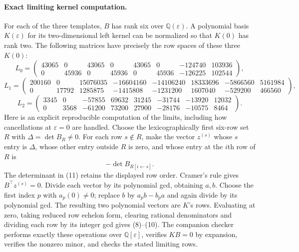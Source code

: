 \documentclass[11pt]{article}
\begin{document}
\paragraph{Exact limiting kernel computation.}
For each of the three templates, $B$ has rank six over
$\mathbb Q(\varepsilon)$. A polynomial basis $K(\varepsilon)$ for
its two-dimensional left kernel can be normalized so that $K(0)$
has rank two. The following matrices have precisely the row spaces
of these three $K(0)$:
\[
 L_0=\begin{pmatrix}
 43065&0&43065&0&43065&0&-124740&103936\\
 0&45936&0&45936&0&45936&-126225&102544
 \end{pmatrix},
 \tag{8}
\]
\[
 L_1=\begin{pmatrix}
 200160&0&15076035&-16604160&-14106240&18333696&-5866560&5161984\\
 0&17792&1285875&-1415808&-1231200&1607040&-529200&466560
 \end{pmatrix},
 \tag{9}
\]
\[
 L_2=\begin{pmatrix}
 3345&0&-57855&69632&31245&-31744&-13920&12032\\
 0&3568&-61200&73200&27900&-28176&-10575&8464
 \end{pmatrix}.
 \tag{10}
\]
Here is an explicit reproducible computation of the limits, including
how cancellations at $\varepsilon=0$ are handled. Choose the
lexicographically first six-row set $R$ with
$\Delta=\det B_R\ne0$. For each row $s\notin R$, make the vector
$z^{(s)}$ whose $s$ entry is $\Delta$, whose other entry outside
$R$ is zero, and whose entry at the $i$th row of $R$ is
\[
 -\det B_{R[i\leftarrow s]}.
 \tag{11}
\]
The determinant in (11) retains the displayed row order. Cramer's
rule gives $B^\top z^{(s)}=0$. Divide each vector by its polynomial
gcd, obtaining $a,b$. Choose the first index $p$ with $a_p(0)\ne0$;
replace $b$ by $a_pb-b_pa$ and again divide by its polynomial gcd.
The resulting two polynomial vectors are $K$'s rows. Evaluating at
zero, taking reduced row echelon form, clearing rational denominators
and dividing each row by its integer gcd gives (8)--(10).
The companion checker performs exactly these operations over
$\mathbb Q[\varepsilon]$, verifies $KB=0$ by expansion, verifies
the nonzero minor, and checks the stated limiting rows.
\end{document}
